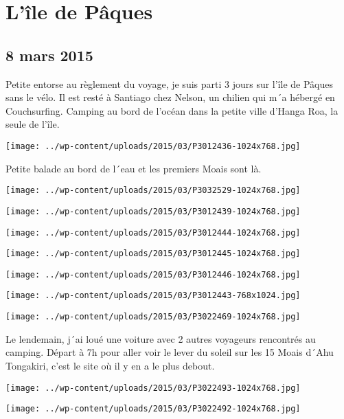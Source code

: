 \chapter{L’île de Pâques}
\section*{8 mars 2015}
Petite entorse au règlement du voyage, je suis parti 3 jours sur l'île de Pâques sans le vélo. Il est resté à Santiago chez Nelson, un chilien qui m´a hébergé en Couchsurfing. \newline
 Camping au bord de l'océan dans la petite ville d'Hanga Roa, la seule de l'île. \newline
 \newline
\centerline{\texttt{[image: ../wp-content/uploads/2015/03/P3012436-1024x768.jpg]} } 
Petite balade au bord de l´eau et les premiers Moais sont là. \newline
 \newline
\centerline{\texttt{[image: ../wp-content/uploads/2015/03/P3032529-1024x768.jpg]} } 
\newline
\centerline{\texttt{[image: ../wp-content/uploads/2015/03/P3012439-1024x768.jpg]} } 
 \newline
\centerline{\texttt{[image: ../wp-content/uploads/2015/03/P3012444-1024x768.jpg]} } 
 \newline
\centerline{\texttt{[image: ../wp-content/uploads/2015/03/P3012445-1024x768.jpg]} } 
 \newline
\centerline{\texttt{[image: ../wp-content/uploads/2015/03/P3012446-1024x768.jpg]} } 
\newline
\centerline{\texttt{[image: ../wp-content/uploads/2015/03/P3012443-768x1024.jpg]} } 
 \newline
\centerline{\texttt{[image: ../wp-content/uploads/2015/03/P3022469-1024x768.jpg]} } 
 \newline
 Le lendemain, j´ai loué une voiture avec 2 autres voyageurs rencontrés au camping. \newline
 Départ à 7h pour aller voir le lever du soleil sur les 15 Moais d´Ahu Tongakiri, c'est le site où il y en a le plus debout. \newline
 \newline
\centerline{\texttt{[image: ../wp-content/uploads/2015/03/P3022493-1024x768.jpg]} } 
 \newline
\centerline{\texttt{[image: ../wp-content/uploads/2015/03/P3022492-1024x768.jpg]} } 
